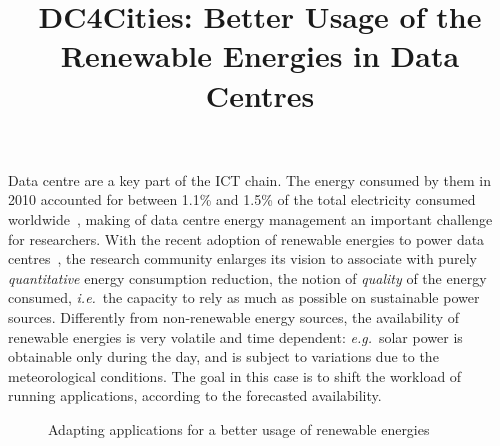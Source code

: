 \documentclass[conference]{IEEEtran}
\newcommand{\ie}{\emph{i.e.}}
\newcommand{\eg}{{\em e.g.}}
\begin{document}
\title{DC4Cities: Better Usage of the Renewable Energies in Data Centres}

\author{
\and
{}
}

\maketitle

Data centre are a key part of the ICT chain.
The energy consumed by them in 2010 accounted for between 1.1\% and 1.5\% of the total electricity consumed worldwide~\cite{Koomey2011}, making of data centre energy management an important challenge for researchers.
With the recent adoption of renewable energies to power data centres~\cite{parasol-sigplan2013}, the research community enlarges its vision to associate with purely \emph{quantitative} energy consumption reduction, the notion of \emph{quality} of the energy consumed, \ie\ the capacity to rely as much as possible on sustainable power sources.
Differently from non-renewable energy sources, the availability of renewable energies is very volatile and time dependent: \eg\ solar power is obtainable only during the day, and is subject to variations due to the meteorological conditions.
The goal in this case is to shift the workload of running applications, according to the forecasted availability.

\begin{figure}[ht!]
  \centering
  \caption{Adapting applications for a better usage of renewable energies}
  \label{fig:adapt}
  \vspace{-1em}
\end{figure}
\end{document}
